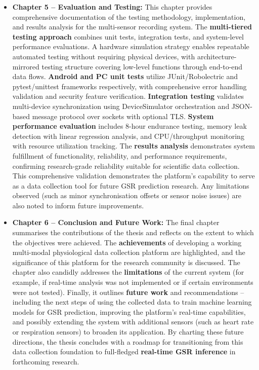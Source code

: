 \documentclass[12pt,a4paper]{article}
\begin{document}
\begin{itemize}
\item
  \textbf{Chapter 5 -- Evaluation and Testing:} This chapter provides comprehensive documentation of the testing methodology, implementation, and results analysis for the multi-sensor recording system. The \textbf{multi-tiered testing approach} combines unit tests, integration tests, and system-level performance evaluations. A hardware simulation strategy enables repeatable automated testing without requiring physical devices, with architecture-mirrored testing structure covering low-level functions through end-to-end data flows. \textbf{Android and PC unit tests} utilize JUnit/Robolectric and pytest/unittest frameworks respectively, with comprehensive error handling validation and security feature verification. \textbf{Integration testing} validates multi-device synchronization using DeviceSimulator orchestration and JSON-based message protocol over sockets with optional TLS. \textbf{System performance evaluation} includes 8-hour endurance testing, memory leak detection with linear regression analysis, and CPU/throughput monitoring with resource utilization tracking. The \textbf{results analysis} demonstrates system fulfillment of functionality, reliability, and performance requirements, confirming research-grade reliability suitable for scientific data collection. This comprehensive validation demonstrates the platform's capability to serve as a data collection tool for future GSR prediction research. Any limitations observed (such as minor synchronisation offsets or sensor noise issues) are also noted to inform future improvements.
\item
  \textbf{Chapter 6 -- Conclusion and Future Work:} The final chapter summarises the contributions of the thesis and reflects on the extent to which the objectives were achieved. The \textbf{achievements} of developing a working multi-modal physiological data collection platform are highlighted, and the significance of this platform for the research community is discussed. The chapter also candidly addresses the \textbf{limitations} of the current system (for example, if real-time analysis was not implemented or if certain environments were not tested). Finally, it outlines \textbf{future work} and recommendations -- including the next steps of using the collected data to train machine learning models for GSR prediction, improving the platform's real-time capabilities, and possibly extending the system with additional sensors (such as heart rate or respiration sensors) to broaden its application. By charting these future directions, the thesis concludes with a roadmap for transitioning from this data collection foundation to full-fledged \textbf{real-time GSR inference} in forthcoming research.
\end{itemize}
\end{document}
